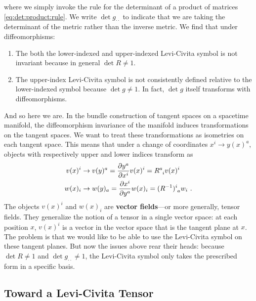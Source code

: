 \documentclass[12pt, oneside]{report}    %
\begin{document}
\begin{subappendices}
where we simply invoke the rule for the determinant of a product of matrices \eqref{eq:det:product:rule}. We write $\det g_{\cdot\cdot}$ to indicate that we are taking the determinant of the metric rather than the inverse metric. We find that under diffeomorphisms:
\begin{enumerate}
    \item The both the lower-indexed and upper-indexed Levi-Civita symbol is not invariant because in general $\det R \neq 1$.
    \item The upper-index Levi-Civita symbol is not consistently defined relative to the lower-indexed symbol because $\det g \neq 1$. In fact, $\det g$ itself transforms with diffeomorphisms.
\end{enumerate}
And so here we are. In the bundle construction of tangent spaces on a spacetime manifold, the diffeomorphism invariance of the manifold induces transformations on the tangent spaces. We want to treat these transformations as isometries on each tangent space. This means that under a change of coordinates $x^i \to y(x)^a$, objects with respectively upper and lower indices transform as
\begin{align}
    v(x)^i &\to v(y)^a = \frac{\partial y^a}{\partial x^i} v(x)^i
    = R\aij{a}{i}v(x)^i
    \\
    w(x)_i &\to w(y)_a = \frac{\partial x^i}{\partial y^a} w(x)_i 
    = (R\inv)\aij{i}{a}w_i 
    \ .
\end{align}
The objects $v(x)^i$ and $w(x)_i$ are \textbf{vector fields}---or more generally, tensor fields. They generalize the notion of a tensor in a single vector space: at each position $x$, $v(x)^i$ is a vector in the vector space that is the tangent plane at $x$. The problem is that we would like to be able to use the Levi-Civita symbol on these tangent planes. But now the issues above rear their heads: because $\det R \neq 1$ and $\det g_{\cdot\cdot} \neq 1$, the Levi-Civita symbol only takes the prescribed form in a specific basis. 

\subsection{Toward a Levi-Civita Tensor}


\end{subappendices}
\end{document}
